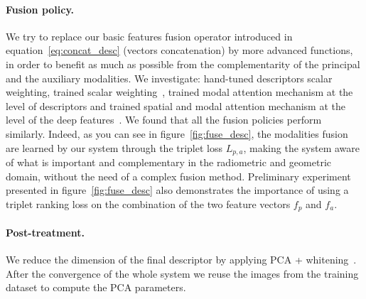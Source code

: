 \paragraph{Fusion policy.}
We try to replace our basic features fusion operator introduced in equation~\ref{eq:concat_desc} (vectors concatenation) by more advanced functions, in order to benefit as much as possible from the complementarity of the principal and the auxiliary modalities. We investigate: hand-tuned descriptors scalar weighting, trained scalar weighting~\cite{Sizikova2016}, trained modal attention mechanism at the level of descriptors and trained spatial and modal attention mechanism at the level of the deep features~\citep{Seymour2018}. We found that all the fusion policies perform similarly. Indeed, as you can see in figure~\ref{fig:fuse_desc}, the modalities fusion are learned by our system through the triplet loss $L_{p, a}$, making the system aware of what is important and complementary in the radiometric and geometric domain, without the need of a complex fusion method. Preliminary experiment presented in figure~\ref{fig:fuse_desc} also demonstrates the importance of using a triplet ranking loss on the combination of the two feature vectors $f_p$ and $f_a$.

\paragraph{Post-treatment.}
We reduce the dimension of the final descriptor by applying PCA + whitening~\citep{Arandjelovic2017, Radenovic2016, Radenovic2017, Gordo2017}. After the convergence of the whole system we reuse the images from the training dataset to compute the PCA parameters.